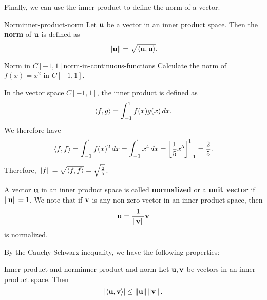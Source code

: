 Finally, we can use the inner product to define the norm of a vector.

\begin{definition}{Norm}{inner-product-norm}
  Let $\vect{u}$ be a vector in an inner product space. Then the
  \textbf{norm}%
   of $\vect{u}$ is defined as
  \begin{equation*}
    \norm{\vect{u}} = \sqrt{\iprod{\vect{u},\vect{u}}}.
  \end{equation*}
\end{definition}

\begin{example}{Norm in $C[-1,1]$}{norm-in-continuous-functions}
  Calculate the norm of $f(x) = x^2$ in $C[-1,1]$.
\end{example}

\begin{solution}
  In the vector space $C[-1,1]$, the inner product is defined as
  \begin{equation*}
    \langle f,g\rangle = \int_{-1}^{1} f(x)g(x)\,dx.
  \end{equation*}
  We therefore have
  \begin{equation*}
    \langle f,f\rangle
    = \int_{-1}^{1} f(x)^2\, dx
    = \int_{-1}^{1} x^4\, dx
    = \left[\frac{1}{5}x^5\right]_{-1}^{1}
    = \frac{2}{5}.
  \end{equation*}
  Therefore, $\left\|f\right\| = \sqrt{\langle f,f\rangle} = \sqrt{\frac{2}{5}}$.
\end{solution}

A vector $\vect{u}$ in an inner product space is called
\textbf{normalized}%
%
 or a \textbf{unit vector}%
%
 if $\norm{\vect{u}} = 1$.
We note that if $\vect{v}$ is any non-zero vector in an inner product
space, then
\begin{equation*}
  \vect{u} = \frac{1}{\norm{\vect{v}}} \vect{v}
\end{equation*}
is normalized.

By the Cauchy-Schwarz inequality, we have the following properties:

\begin{proposition}{Inner product and norm}{inner-product-and-norm}
  Let $\vect{u},\vect{v}$ be vectors in an inner product space. Then
  \begin{equation*}
    \abs{\iprod{\vect{u},\vect{v}}} \leq \norm{\vect{u}}\norm{\vect{v}}.
  \end{equation*}
\end{proposition}

